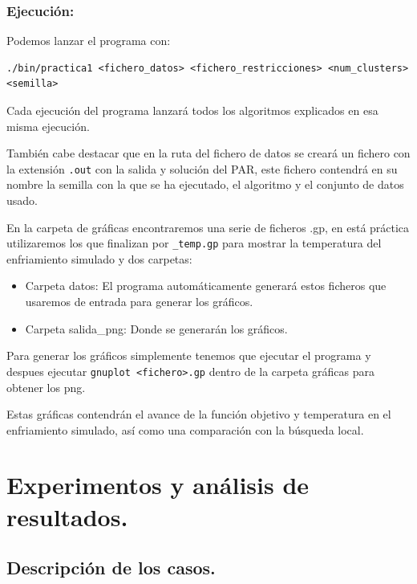 \documentclass[12pt, spanish]{article}
\begin{document}
\subsubsection{Ejecución:}

Podemos lanzar el programa con:

\begin{lstlisting}
./bin/practica1 <fichero_datos> <fichero_restricciones> <num_clusters> <semilla>
\end{lstlisting}

Cada ejecución del programa lanzará todos los algoritmos explicados en esa misma ejecución.

También cabe destacar que en la ruta del fichero de datos se creará un fichero con la extensión \texttt{.out} con la salida y solución del PAR, este fichero contendrá en su nombre la semilla con la que se ha ejecutado, el algoritmo y el conjunto de datos usado.

En la carpeta de gráficas encontraremos una serie de ficheros .gp, en está práctica utilizaremos los que finalizan por \texttt{\_temp.gp} para mostrar la temperatura del enfriamiento simulado y dos carpetas:

\begin{itemize}
	\item Carpeta datos: El programa automáticamente generará estos ficheros que usaremos de entrada para generar los gráficos.
	\item Carpeta salida\_png: Donde se generarán los gráficos.
\end{itemize}

Para generar los gráficos simplemente tenemos que ejecutar el programa y despues ejecutar \texttt{gnuplot <fichero>.gp} dentro de la carpeta gráficas para obtener los png.

Estas gráficas contendrán el avance de la función objetivo y temperatura en el enfriamiento simulado, así como una comparación con la búsqueda local.

\newpage




\section{Experimentos y análisis de resultados.}


\subsection{Descripción de los casos.}
\end{document}
